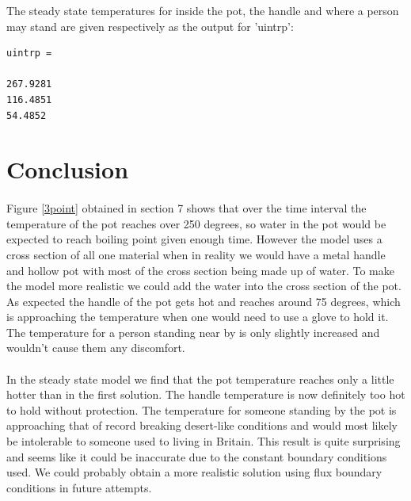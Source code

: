 \documentclass[12pt]{article}  %
\begin{document}
The steady state temperatures for inside the pot, the handle and where a person may stand are given respectively as the output for 'uintrp':

\begin{lstlisting}
uintrp =

267.9281
116.4851
54.4852
\end{lstlisting}


\section{Conclusion}
\paragraph{} Figure \ref{3point} obtained in section 7 shows that over the time interval the temperature of the pot reaches over 250 degrees, so water in the pot would be expected to reach boiling point given enough time. However the model uses a cross section of all one material when in reality we would have a metal handle and hollow pot with most of the cross section being made up of water. To make the model more realistic we could add the water into the cross section of the pot. As expected the handle of the pot gets hot and reaches around 75 degrees, which is approaching the temperature when one would need to use a glove to hold it. The temperature for a person standing near by is only slightly increased and wouldn't cause them any discomfort.
\paragraph{}In the steady state model we find that the pot temperature reaches only a little hotter than in the first solution. The handle temperature is now definitely too hot to hold without protection. The temperature for someone standing by the pot is approaching that of record breaking desert-like conditions and would most likely be intolerable to someone used to living in Britain. This result is quite surprising and seems like it could be inaccurate due to the constant boundary conditions used. We could probably obtain a more realistic solution using flux boundary conditions in future attempts.



%
%
%
\end{document}

